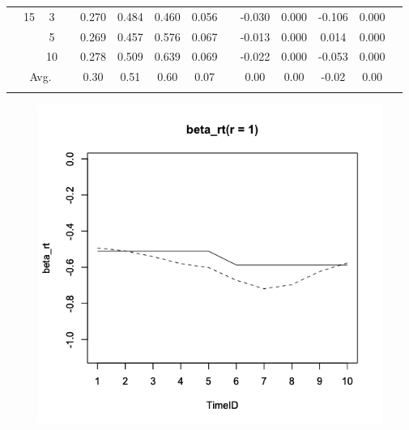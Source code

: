 \documentclass[a4paper,11pt,oneside,openany]{jsbook}
\newcommand{\bhline}[1]{\noalign{\hrule height #1}}
\begin{document}
\begin{table}[tb]
\begin{center}
\begin{tabular}{cccccccccccccc}
  \cline{2-14}
  & 15 & 3  &  & 0.270 & 0.484 & 0.460 & 0.056 &  & -0.030 & 0.000 & -0.106 & 0.000 \\
  &    & 5  &  & 0.269 & 0.457 & 0.576 & 0.067 &  & -0.013 & 0.000 & 0.014  & 0.000 \\
  &    & 10 &  & 0.278 & 0.509 & 0.639 & 0.069 &  & -0.022 & 0.000 & -0.053 & 0.000\\
  \hline
  \multicolumn{4}{c}{Avg.}   &  0.30 & 0.51 & 0.60 & 0.07 &  & 0.00 & 0.00 & -0.02 & 0.00 & \\
  \bhline{1pt}
  \end{tabular}
  \label{parameters_recovery2}
  \end{center}
  \end{table}
  
\begin{figure}[]
 \begin{minipage}[tb]{0.3\linewidth}
  \centering
  \includegraphics[keepaspectratio,scale=0.25]{img/beta_rt_param_1.png}
  \label{ICC1}
 \end{minipage}
 \begin{minipage}[tb]{0.3\linewidth}
  \centering

\end{minipage}
\end{figure}
\end{document}
